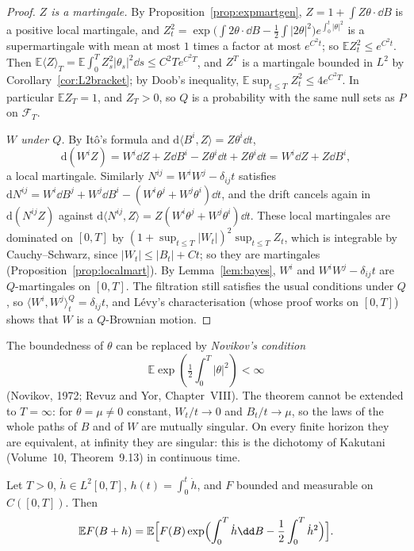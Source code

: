 \begin{proof}
\emph{$Z$ is a martingale.} By Proposition~\ref{prop:expmartgen}, $Z=1+\int Z\theta\cdot\dd B$ is a positive local martingale, and $Z_t^2=\exp\bigl(\int2\theta\cdot\dd B-\frac12\int|2\theta|^2\bigr)e^{\int_0^t|\theta|^2}$ is a
supermartingale with mean at most $1$ times a factor at most $e^{C^2t}$; so $\mathbb EZ_t^2\le e^{C^2t}$. Then $\mathbb E\langle Z\rangle_T=\mathbb E\int_0^TZ_s^2|\theta_s|^2\dd s\le C^2Te^{C^2T}$, and $Z^T$ is a martingale bounded in
$L^2$ by Corollary~\ref{cor:L2bracket}; by Doob's inequality, $\mathbb E\sup_{t\le T}Z_t^2\le4e^{C^2T}$. In particular $\mathbb EZ_T=1$, and $Z_T>0$, so $Q$ is a probability with the same null sets as $P$ on $\mathcal F_T$.

\emph{$W$ under $Q$.} By It\^o's formula and $\mathrm d\langle B^i,Z\rangle=Z\theta^i\dd t$,
\[
\mathrm d(W^iZ)=W^i\dd Z+Z\dd B^i-Z\theta^i\dd t+Z\theta^i\dd t=W^i\dd Z+Z\dd B^i,
\]
a local martingale. Similarly $N^{ij}=W^iW^j-\delta_{ij}t$ satisfies $\mathrm dN^{ij}=W^i\dd B^j+W^j\dd B^i-(W^i\theta^j+W^j\theta^i)\dd t$, and the drift cancels again in $\mathrm d(N^{ij}Z)$ against
$\mathrm d\langle N^{ij},Z\rangle=Z(W^i\theta^j+W^j\theta^i)\dd t$. These local martingales are dominated on $[0,T]$ by $(1+\sup_{t\le T}|W_t|)^2\sup_{t\le T}Z_t$, which is integrable by Cauchy--Schwarz, since
$|W_t|\le|B_t|+Ct$; so they are martingales (Proposition~\ref{prop:localmart}). By Lemma~\ref{lem:bayes}, $W^i$ and $W^iW^j-\delta_{ij}t$ are $Q$-martingales on $[0,T]$. The filtration still satisfies the usual
conditions under $Q$, so $\langle W^i,W^j\rangle^Q_t=\delta_{ij}t$, and L\'evy's characterisation (whose proof works on $[0,T]$) shows that $W$ is a $Q$-Brownian motion.
\end{proof}

\begin{remark}
The boundedness of $\theta$ can be replaced by \emph{Novikov's condition}
\[
\mathbb E\exp(\tfrac12\int_0^T|\theta|^2)<\infty
\]
(Novikov, 1972; Revuz and Yor, Chapter~VIII). The theorem cannot be extended to $T=\infty$:
for $\theta=\mu\ne0$ constant, $W_t/t\to0$ and $B_t/t\to\mu$, so the laws of the whole paths of $B$ and of $W$ are mutually singular. On every finite horizon they are equivalent, at infinity they are singular: this is the
dichotomy of Kakutani (Volume~10, Theorem~9.13) in continuous time.
\end{remark}

\begin{corollary}\label{cor:cameronmartin}
Let $T>0$, $\dot h\in L^2[0,T]$, $h(t)=\int_0^t\dot h$, and $F$ bounded and measurable on $C([0,T])$. Then
\[
\mathbb EF(B+h)=\mathbb E\Bigl[F(B)\exp\Bigl(\int_0^T\dot h\dd B-\frac12\int_0^T\dot h^2\Bigr)\Bigr].
\]
\end{corollary}

